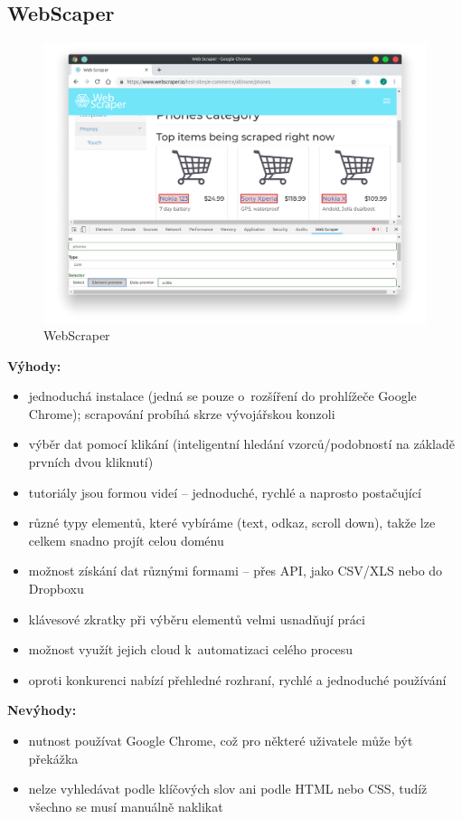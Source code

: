 \documentclass[thesis=B,czech]{FITthesis}[2012/06/26]
\begin{document}
\newpage
\subsection{WebScaper}
\begin{figure}
	\includegraphics[width=\linewidth]{images/WebScraper.png}
	\caption{WebScraper}
	\label{fig:webScraper}
\end{figure}
\textbf{Výhody:}
\begin{itemize}
	\item jednoduchá instalace (jedná se pouze o~rozšíření do prohlížeče Google Chrome); scrapování probíhá skrze vývojářskou konzoli
	\item výběr dat pomocí klikání (inteligentní hledání vzorců/podobností na základě prvních dvou kliknutí)
	\item tutoriály jsou formou videí -- jednoduché, rychlé a naprosto postačující
	\item různé typy elementů, které vybíráme (text, odkaz, scroll down), takže lze celkem snadno projít celou doménu
	\item možnost získání dat různými formami -- přes API, jako CSV/XLS nebo do Dropboxu
	\item klávesové zkratky při výběru elementů velmi usnadňují práci
	\item možnost využít jejich cloud k~automatizaci celého procesu
	\item oproti konkurenci nabízí přehledné rozhraní, rychlé a jednoduché používání
\end{itemize}
\textbf{Nevýhody:}
\begin{itemize}
	\item nutnost používat Google Chrome, což pro některé uživatele může být překážka
	\item nelze vyhledávat podle klíčových slov ani podle HTML nebo CSS, tudíž všechno se musí manuálně naklikat
\end{itemize}
\end{document}
